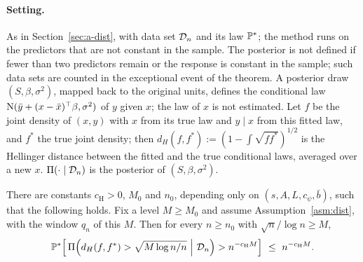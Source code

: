 \paragraph{Setting.} As in Section~\ref{sec:a-dist}, with data set $\Dn$ and its law $\P^*$; the method runs on the
predictors that are not constant in the sample. The posterior is not defined if fewer than two predictors remain or the
response is constant in the sample; such data sets are counted in the exceptional event of the theorem. A posterior draw
$(S,\beta,\sigma^2)$, mapped back to the original units, defines the conditional law $\Normal(\bar y+(x-\bar
x)^\top\beta,\sigma^2)$ of $y$ given $x$; the law of $x$ is not estimated. Let $f$ be the joint density of $(x,y)$ with
$x$ from its true law and $y\mid x$ from this fitted law, and $f^*$ the true joint density; then
$d_H(f,f^*):=(1-\int\sqrt{ff^*})^{1/2}$ is the Hellinger distance between the fitted and the true conditional laws,
averaged over a new $x$. $\Pi(\cdot\mid\Dn)$ is the posterior of $(S,\beta,\sigma^2)$.

\begin{mainthm}\label{thm:dist}
There are constants $c_{\mathrm H}>0$, $M_0$ and $n_0$, depending only on $(s,A,L,c_\psi,\bar b)$, such that the following
holds. Fix a level $M\ge M_0$ and assume Assumption~\ref{asm:dist}, with the window $q_n$ of this $M$. Then for every
$n\ge n_0$ with $\sqrt n/\log n\ge M$,
\begin{equation}\label{eq:dist-i}
  \P^*\Big[\,\Pi\Big(d_H(f,f^*)>\sqrt{M\log n/n}\ \Big|\ \Dn\Big)>n^{-c_{\mathrm H} M}\Big]\ \le\ n^{-c_{\mathrm H} M}.
\end{equation}
\end{mainthm}




